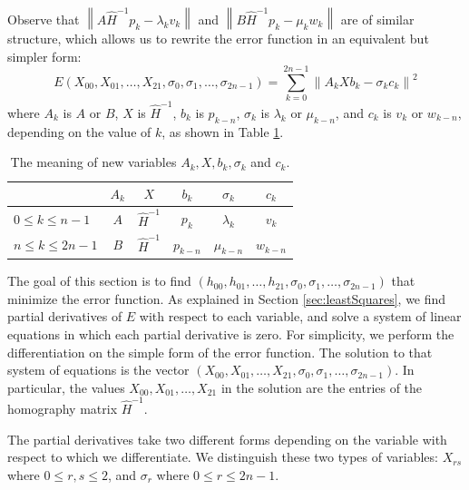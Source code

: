 \documentclass[11pt, oneside, reqno]{book}
\begin{document}
Observe that $\left\| A\widehat{H}^{-1}p_k - \lambda_k v_k\right\|$ and $\left\|B\widehat{H}^{-1}p_k - \mu_k w_k\right\|$ are of similar structure, which allows us to rewrite the error function in an equivalent but simpler form:
\[
E(X_{00}, X_{01}, \dots, X_{21}, \sigma_0, \sigma_1, \dots, \sigma_{2n-1}) 
= \sum_{k=0}^{2n-1} \left\| A_k X b_k - \sigma_k c_k\right\|^2
\]
where $A_k$ is $A$ or $B$, $X$ is $\widehat{H}^{-1}$, $b_k$ is $p_{k-n}$, $\sigma_k$ is $\lambda_k$ or $\mu_{k-n}$, and $c_k$ is $v_k$ or $w_{k-n}$, depending on the value of $k$, as shown in Table \ref{fig:errorVarMeaning}.
\begin{table}[ht]
\renewcommand{\arraystretch}{1.5}
\centering
	\begin{tabular}{ l || c | c | c | c | c }
		& $A_k$ & $X$ & $b_k$ & $\sigma_k$ & $c_k$ \\ \hline
		\hline
		$0 \le k \le n-1$ & $A$ & $\widehat{H}^{-1}$ & $p_k$ & $\lambda_k$ & $v_k$ \\ \hline
		$n \le k \le 2n-1$ & $B$ & $\widehat{H}^{-1}$ & $p_{k-n}$ & $\mu_{k-n}$ & $w_{k-n}$ \\
	\end{tabular}
	\caption{The meaning of new variables $A_k, X, b_k, \sigma_k$ and $c_k$.}
	\label{fig:errorVarMeaning}
\end{table}

The goal of this section is to find $(h_{00}, h_{01}, \dots, h_{21}, \sigma_0, \sigma_1, \dots, \sigma_{2n-1})$ that minimize the error function. As explained in Section \ref{sec:leastSquares}, we find partial derivatives of $E$ with respect to each variable, and solve a system of linear equations in which each partial derivative is zero. For simplicity, we perform the differentiation on the simple form of the error function. The solution to that system of equations is the vector $(X_{00}, X_{01}, \dots, X_{21}, \sigma_0, \sigma_1, \dots, \sigma_{2n-1})$. In particular, the values $X_{00}, X_{01}, \dots, X_{21}$ in the solution are the entries of the homography matrix $\widehat{H}^{-1}$.

The partial derivatives take two different forms depending on the variable with respect to which we differentiate. We distinguish these two types of variables: $X_{rs}$ where $0 \le r,s \le 2$, and $\sigma_r$ where $0 \le r \le 2n-1$.
\end{document}
